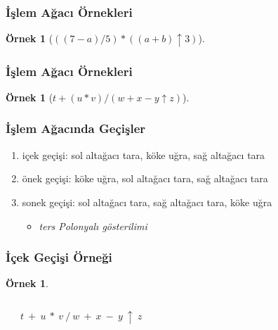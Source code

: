 \documentclass[dvipsnames]{beamer}
\theoremstyle{definition}
\theoremstyle{example}
\newtheorem{ornek}[theorem]{Örnek}
\theoremstyle{plain}
\begin{document}
\begin{frame}
  \frametitle{İşlem Ağacı Örnekleri}

  \begin{ornek}[$((7-a)/5)*((a+b) \uparrow 3)$]
    \begin{center}
    \end{center}
  \end{ornek}
\end{frame}

\begin{frame}
  \frametitle{İşlem Ağacı Örnekleri}

  \begin{ornek}[$t+(u*v)/(w+x-y \uparrow z)$]
    \begin{center}
    \end{center}
  \end{ornek}
\end{frame}

\begin{frame}
  \frametitle{İşlem Ağacında Geçişler}

  \begin{enumerate}
    \item \alert{içek geçişi}: sol altağacı tara, köke uğra, sağ altağacı tara

    \medskip
    \item \alert{önek geçişi}: köke uğra, sol altağacı tara, sağ altağacı tara

    \medskip
    \item \alert{sonek geçişi}: sol altağacı tara, sağ altağacı tara, köke uğra
    \begin{itemize}
      \item \emph{ters Polonyalı gösterilimi}
    \end{itemize}
  \end{enumerate}
\end{frame}

\begin{frame}
  \frametitle{İçek Geçişi Örneği}

  \begin{ornek}
    \begin{columns}
      \begin{center}
      \end{center}

      $t ~ + ~ u ~ * ~ v ~ / ~ w ~ + ~ x ~ - ~ y ~ \uparrow ~ z$
    \end{columns}
  \end{ornek}
\end{frame}
\end{document}
